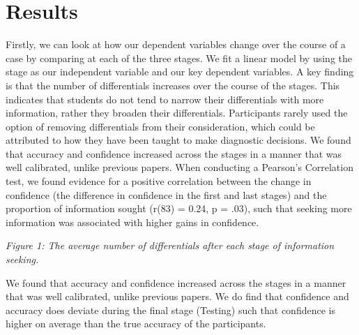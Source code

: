 \documentclass[a4paper, nobind]{templates/ociamthesis}
\begin{document}
\hypertarget{results}{%
\section*{Results}\label{results}}

Firstly, we can look at how our dependent variables change over the course of a case by comparing at each of the three stages. We fit a linear model by using the stage as our independent variable and our key dependent variables. A key finding is that the number of differentials increases over the course of the stages. This indicates that students do not tend to narrow their differentials with more information, rather they broaden their differentials. Participants rarely used the option of removing differentials from their consideration, which could be attributed to how they have been taught to make diagnostic decisions. We found that accuracy and confidence increased across the stages in a manner that was well calibrated, unlike previous papers. When conducting a Pearson's Correlation test, we found evidence for a positive correlation between the change in confidence (the difference in confidence in the first and last stages) and the proportion of information sought (r(83) = 0.24, p = .03), such that seeking more information was associated with higher gains in confidence.

\emph{Figure 1: The average number of differentials after each stage of information seeking.}

We found that accuracy and confidence increased across the stages in a manner that was well calibrated, unlike previous papers. We do find that confidence and accuracy does deviate during the final stage (Testing) such that confidence is higher on average than the true accuracy of the participants.
\end{document}
